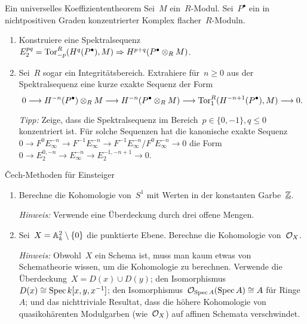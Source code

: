 \documentclass{uebblatt}
\begin{document}

\begin{aufgabe}{Ein universelles Koeffiziententheorem}
Sei~$M$ ein~$R$-Modul. Sei~$P^\bullet$ ein in nichtpositiven Graden
konzentrierter Komplex flacher~$R$-Moduln.
\begin{enumerate}
\item Konstruiere eine Spektralsequenz $E_2^{pq} =
\Tor_{-p}^R(H^q(P^\bullet),M) \Rightarrow H^{p+q}(P^\bullet \otimes_R M)$.
\item Sei~$R$ sogar ein Integritätsbereich. Extrahiere für~$n \geq 0$ aus der
Spektralsequenz eine kurze exakte Sequenz der Form
\[ 0 \lra H^{-n}(P^\bullet) \otimes_R M \lra H^{-n}(P^\bullet \otimes_R M)
  \lra \Tor_1^R(H^{-n+1}(P^\bullet), M) \lra 0. \]
{\tiny\emph{Tipp:} Zeige, dass die Spektralsequenz im Bereich~$p \in \{ 0,-1
\}, q \leq 0$ konzentriert ist. Für solche Sequenzen hat die
kanonische exakte Sequenz $0 \to F^0 E_\infty^{-n} \to F^{-1}
E_\infty^{-n} \to F^{-1} E_\infty^{-n} / F^0 E_\infty^{-n} \to 0$ die Form
$0 \to E_2^{0,-n} \to E_\infty^{-n} \to E_2^{-1,-n+1} \to 0$.\par}
\end{enumerate}
\end{aufgabe}

\begin{aufgabe}{Čech-Methoden für Einsteiger}
\begin{enumerate}
\item Berechne die Kohomologie von~$S^1$ mit Werten in der konstanten Garbe~$\ul{\ZZ}$.

{\tiny\emph{Hinweis:} Verwende eine Überdeckung durch drei offene Mengen.\par}

\item Sei~$X = \AA^2_k \setminus \{0\}$ die punktierte Ebene.
Berechne die Kohomologie von~$\O_X$.

{\tiny\emph{Hinweis:} Obwohl~$X$ ein Schema ist, muss man kaum etwas von
Schematheorie wissen, um die Kohomologie zu berechnen. Verwende die
Überdeckung~$X = D(x) \cup D(y)$; den Isomorphismus~$D(x) \cong \Spec
k[x,y,x^{-1}]$; den Isomorphismus~$\O_{\Spec A}(\Spec A) \cong A$ für
Ringe~$A$; und das nichttriviale Resultat, dass die höhere Kohomologie von
quasikohärenten Modulgarben (wie~$\O_X$) auf affinen Schemata
verschwindet.\par}
\end{enumerate}
\end{aufgabe}
\end{document}
